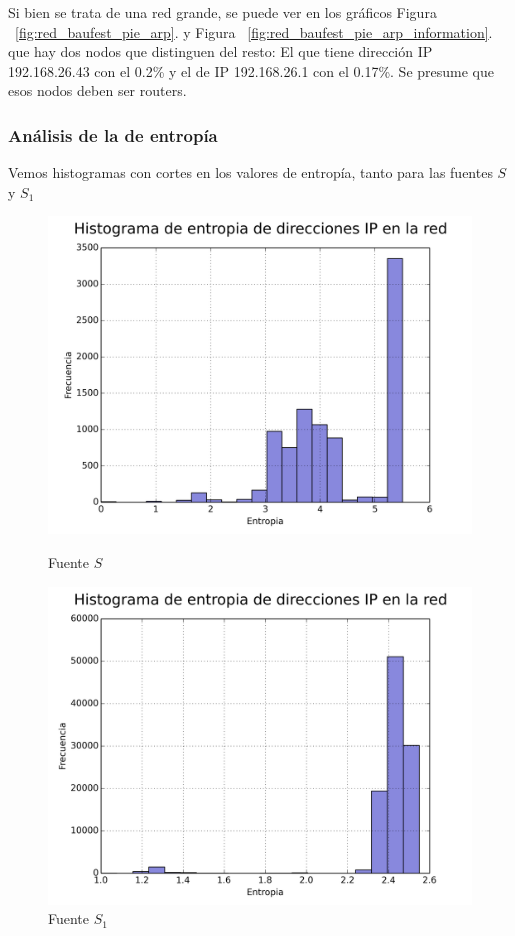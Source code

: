 Si bien se trata de una red grande, se puede ver en los gráficos Figura ~\ref{fig:red_baufest_pie_arp}. y Figura ~\ref{fig:red_baufest_pie_arp_information}. que hay dos nodos que distinguen del resto: El que tiene dirección IP 192.168.26.43 con el 0.2\% y el de IP 192.168.26.1 con el 0.17\%. Se presume que esos nodos deben ser routers. 

\FloatBarrier

\subsubsection{Análisis de la de entropía}

Vemos histogramas con cortes en los valores de entropía, tanto para las fuentes $S$ y $S_1$

\begin{figure}[ht!]
  \centering
  \begin{minipage}[b]{0.48\textwidth}
    \includegraphics[width=\textwidth]{graficos/red_baufest_hist_arp.png}
    \caption{Fuente $S$}
    \label{fig:red_baufest_hist_arp}
  \end{minipage}
  \hfill
  \begin{minipage}[b]{0.48\textwidth}
    \includegraphics[width=\textwidth]{graficos/red_domestica_hist_arp.png}
    \caption{Fuente $S_1$}
    \label{fig:red_domestica_hist_arp}
  \end{minipage}
\end{figure}
